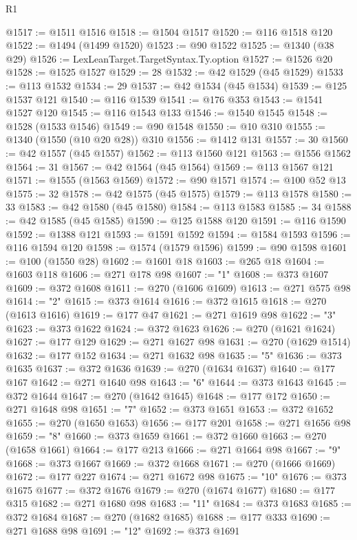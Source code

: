 \begin{lexlean}{R1}
\begin{coremodule}
@1517 := @1511 @1516
@1518 := @1504 @1517
@1520 := @116 @1518 @120
@1522 := @1494 (@1499 @1520)
@1523 := @90 @1522
@1525 := @1340 (@38 @29)
@1526 := LexLeanTarget.TargetSyntax.Ty.option
@1527 := @1526 @20
@1528 := @1525 @1527
@1529 := 28
@1532 := @42 @1529 (@45 @1529)
@1533 := @113 @1532
@1534 := 29
@1537 := @42 @1534 (@45 @1534)
@1539 := @125 @1537 @121
@1540 := @116 @1539
@1541 := @176 @353
@1543 := @1541 @1527 @120
@1545 := @116 @1543 @133
@1546 := @1540 @1545
@1548 := @1528 (@1533 @1546)
@1549 := @90 @1548
@1550 := @10 @310
@1555 := @1340 (@1550 (@10 @20 @28)) @310
@1556 := @1412 @131
@1557 := 30
@1560 := @42 @1557 (@45 @1557)
@1562 := @113 @1560 @121
@1563 := @1556 @1562
@1564 := 31
@1567 := @42 @1564 (@45 @1564)
@1569 := @113 @1567 @121
@1571 := @1555 (@1563 @1569)
@1572 := @90 @1571
@1574 := @100 @52 @13
@1575 := 32
@1578 := @42 @1575 (@45 @1575)
@1579 := @113 @1578
@1580 := 33
@1583 := @42 @1580 (@45 @1580)
@1584 := @113 @1583
@1585 := 34
@1588 := @42 @1585 (@45 @1585)
@1590 := @125 @1588 @120
@1591 := @116 @1590
@1592 := @1388 @121
@1593 := @1591 @1592
@1594 := @1584 @1593
@1596 := @116 @1594 @120
@1598 := @1574 (@1579 @1596)
@1599 := @90 @1598
@1601 := @100 (@1550 @28)
@1602 := @1601 @18
@1603 := @265 @18
@1604 := @1603 @118
@1606 := @271 @178 @98
@1607 := "1"
@1608 := @373 @1607
@1609 := @372 @1608
@1611 := @270 (@1606 @1609)
@1613 := @271 @575 @98
@1614 := "2"
@1615 := @373 @1614
@1616 := @372 @1615
@1618 := @270 (@1613 @1616)
@1619 := @177 @47
@1621 := @271 @1619 @98
@1622 := "3"
@1623 := @373 @1622
@1624 := @372 @1623
@1626 := @270 (@1621 @1624)
@1627 := @177 @129
@1629 := @271 @1627 @98
@1631 := @270 (@1629 @1514)
@1632 := @177 @152
@1634 := @271 @1632 @98
@1635 := "5"
@1636 := @373 @1635
@1637 := @372 @1636
@1639 := @270 (@1634 @1637)
@1640 := @177 @167
@1642 := @271 @1640 @98
@1643 := "6"
@1644 := @373 @1643
@1645 := @372 @1644
@1647 := @270 (@1642 @1645)
@1648 := @177 @172
@1650 := @271 @1648 @98
@1651 := "7"
@1652 := @373 @1651
@1653 := @372 @1652
@1655 := @270 (@1650 @1653)
@1656 := @177 @201
@1658 := @271 @1656 @98
@1659 := "8"
@1660 := @373 @1659
@1661 := @372 @1660
@1663 := @270 (@1658 @1661)
@1664 := @177 @213
@1666 := @271 @1664 @98
@1667 := "9"
@1668 := @373 @1667
@1669 := @372 @1668
@1671 := @270 (@1666 @1669)
@1672 := @177 @227
@1674 := @271 @1672 @98
@1675 := "10"
@1676 := @373 @1675
@1677 := @372 @1676
@1679 := @270 (@1674 @1677)
@1680 := @177 @315
@1682 := @271 @1680 @98
@1683 := "11"
@1684 := @373 @1683
@1685 := @372 @1684
@1687 := @270 (@1682 @1685)
@1688 := @177 @333
@1690 := @271 @1688 @98
@1691 := "12"
@1692 := @373 @1691

\end{coremodule}
\end{lexlean}
